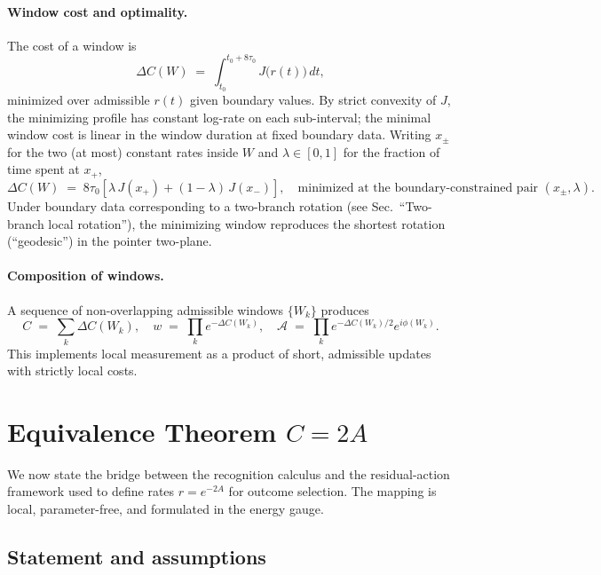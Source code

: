 \documentclass[11pt,letterpaper]{article}
\theoremstyle{definition}
\begin{document}
\paragraph{Window cost and optimality.}
The cost of a window is
\begin{equation}
\Delta C(W)\;=\;\int_{t_0}^{t_0+8\tau_0}\!\!\!J\!\bigl(r(t)\bigr)\,dt,
\end{equation}
minimized over admissible \(r(t)\) given boundary values. By strict convexity of \(J\), the minimizing profile has constant log-rate on each sub-interval; the minimal window cost is linear in the window duration at fixed boundary data. Writing \(x_\pm\) for the two (at most) constant rates inside \(W\) and \(\lambda\in[0,1]\) for the fraction of time spent at \(x_+\),
\begin{equation}
\Delta C(W)\;=\;8\tau_0\left[\lambda\,J(x_+)+(1-\lambda)\,J(x_-)\right],
\quad
\text{minimized at the boundary-constrained pair } (x_\pm,\lambda).
\end{equation}
Under boundary data corresponding to a two-branch rotation (see Sec.~``Two-branch local rotation''), the minimizing window reproduces the shortest rotation (``geodesic'') in the pointer two-plane.

\paragraph{Composition of windows.}
A sequence of non-overlapping admissible windows \(\{W_k\}\) produces
\[
C\;=\;\sum_k \Delta C(W_k),\quad
w\;=\;\prod_k e^{-\Delta C(W_k)},\quad
\mathcal A\;=\;\prod_k e^{-\Delta C(W_k)/2}e^{i\phi(W_k)}.
\]
This implements local measurement as a product of short, admissible updates with strictly local costs.


\section{Equivalence Theorem \(C=2A\)}

We now state the bridge between the recognition calculus and the residual-action framework used to define rates \(r=e^{-2A}\) for outcome selection. The mapping is local, parameter-free, and formulated in the energy gauge.

\subsection{Statement and assumptions}
\end{document}

